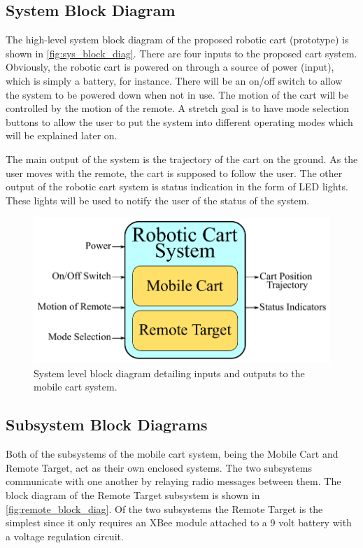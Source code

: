 \documentclass[letterpaper,12pt]{article}   %
\begin{document}
\subsection{System Block Diagram}
The high-level system block diagram of the proposed robotic cart (prototype) is shown in \autoref{fig:sys_block_diag}. There are four inputs to the proposed cart system. Obviously, the robotic cart is powered on through a source of power (input), which is simply a battery, for instance. There will be an on/off switch to allow the system to be powered down when not in use. The motion of the cart will be controlled by the motion of the remote. A stretch goal is to have mode selection buttons to allow the user to put the system into different operating modes which will be explained later on.

\vspace*{12pt}
\noindent
The main output of the system is the trajectory of the cart on the ground. As the user moves with the remote, the cart is supposed to follow the user. The other output of the robotic cart system is status indication in the form of LED lights. These lights will be used to notify the user of the status of the system.

\begin{figure}[!h]
    \centering
    \includegraphics[scale=0.9]{figs/system_block_diagram_2}
    \caption{System level block diagram detailing inputs and outputs to the
      mobile cart system.}
	\label{fig:sys_block_diag}
\end{figure}

\subsection{Subsystem Block Diagrams}
Both of the subsystems of the mobile cart system, being the Mobile Cart and Remote Target, act as their own enclosed systems. The two subsystems communicate with one another by relaying radio messages between them. The block diagram of the Remote Target subsystem is shown in \autoref{fig:remote_block_diag}. Of the two subsystems the Remote Target is the simplest since it only requires an XBee module attached to a 9 volt battery with a voltage regulation circuit.
\end{document}
